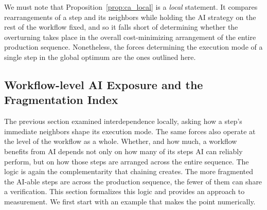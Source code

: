 We must note that Proposition~\ref{prop:ca_local} is a \emph{local} statement. It compares rearrangements of a step and its neighbors while holding the AI strategy on the rest of the workflow fixed, and so it falls short of determining whether the overturning takes place in the overall cost-minimizing arrangement of the entire production sequence.
Nonetheless, the forces determining the execution mode of a single step in the global optimum are the ones outlined here.

\subsection{Workflow-level AI Exposure and the Fragmentation Index}
\label{sec:fragmentation}

The previous section examined interdependence locally, asking how a step's immediate neighbors shape its execution mode.
The same forces also operate at the level of the workflow as a whole. Whether, and how much, a workflow benefits from AI depends not only on how many of its steps AI can reliably perform, but on how those steps are arranged across the entire sequence.
The logic is again the complementarity that chaining creates. The more fragmented the AI-able steps are across the production sequence, the fewer of them can share a verification.
This section formalizes this logic and provides an approach to measurement.
We first start with an example that makes the point numerically.

